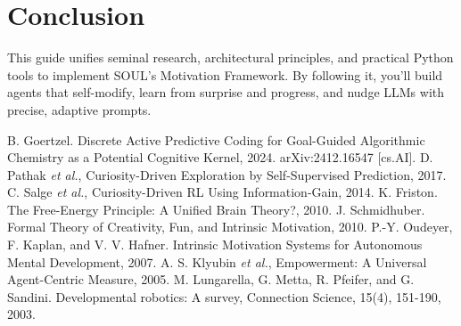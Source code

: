 \documentclass[11pt]{article}
\begin{document}
\section{Conclusion}
This guide unifies seminal research, architectural principles, and practical Python tools to implement SOUL’s Motivation Framework. By following it, you’ll build agents that self-modify, learn from surprise and progress, and nudge LLMs with precise, adaptive prompts.

\begin{thebibliography}{99}
 B. Goertzel. Discrete Active Predictive Coding for Goal-Guided Algorithmic Chemistry as a Potential Cognitive Kernel, 2024. arXiv:2412.16547 [cs.AI].
 D. Pathak \emph{et al.}, Curiosity-Driven Exploration by Self-Supervised Prediction, 2017.
 C. Salge \emph{et al.}, Curiosity-Driven RL Using Information-Gain, 2014.
 K. Friston. The Free-Energy Principle: A Unified Brain Theory?, 2010.
 J. Schmidhuber. Formal Theory of Creativity, Fun, and Intrinsic Motivation, 2010.
 P.-Y. Oudeyer, F. Kaplan, and V. V. Hafner. Intrinsic Motivation Systems for Autonomous Mental Development, 2007.
 A. S. Klyubin \emph{et al.}, Empowerment: A Universal Agent-Centric Measure, 2005.
 M. Lungarella, G. Metta, R. Pfeifer, and G. Sandini. Developmental robotics: A survey, Connection Science, 15(4), 151-190, 2003.
\end{thebibliography}
\end{document}
